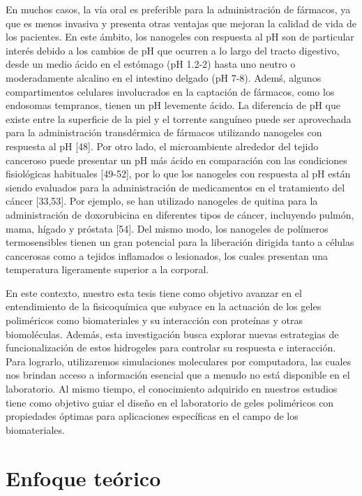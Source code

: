 En muchos casos, la v\'ia oral es preferible para la administraci\'on de f\'armacos, ya que es menos invasiva y presenta otras ventajas que mejoran la calidad de vida de los pacientes. En este \'ambito, los nanogeles con respuesta al pH son de particular inter\'es debido a los cambios de pH que ocurren a lo largo del tracto digestivo, desde un medio \'acido en el est\'omago (pH 1.2-2) hasta uno neutro o moderadamente alcalino en el intestino delgado (pH 7-8). Adem\'s, algunos compartimentos celulares involucrados en la captaci\'on de f\'armacos, como los endosomas tempranos, tienen un pH levemente \'acido. La diferencia de pH que existe entre la superficie de la piel  y el torrente sangu\'ineo puede ser aprovechada para la administraci\'on transd\'ermica de f\'armacos utilizando nanogeles con respuesta al pH [48]. Por otro lado, el microambiente alrededor del tejido canceroso puede presentar un pH m\'as ácido en comparaci\'on con las condiciones fisiol\'ogicas habituales [49-52], por lo que los nanogeles con respuesta al pH est\'an siendo evaluados para la administraci\'on de medicamentos en el tratamiento del c\'ancer [33,53]. Por ejemplo, se han utilizado nanogeles de quitina para la administraci\'on de doxorubicina en diferentes tipos de c\'ancer, incluyendo pulm\'on, mama, h\'igado y pr\'ostata [54]. Del mismo modo, los nanogeles de pol\'imeros termosensibles tienen un gran potencial para la liberaci\'on dirigida tanto a c\'elulas cancerosas como a tejidos inflamados o lesionados, los cuales presentan una temperatura ligeramente superior a la corporal.
	
En este contexto, nuestro esta tesis tiene como objetivo avanzar en el entendimiento de la fisicoqu\'imica que subyace en la actuaci\'on de los geles polim\'ericos como biomateriales y su interacci\'on con prote\'inas y otras biomol\'eculas. Adem\'as, esta investigaci\'on busca explorar nuevas estrategias de funcionalizaci\'on de estos hidrogeles para controlar su respuesta e interacci\'on. Para lograrlo, utilizaremos simulaciones moleculares por computadora, las cuales nos brindan acceso a informaci\'on esencial que a menudo no est\'a disponible en el laboratorio. Al mismo tiempo, el conocimiento adquirido en nuestros estudios tiene como objetivo guiar el dise\~no en el laboratorio de geles polim\'ericos con propiedades \'optimas para aplicaciones espec\'ificas en el campo de los biomateriales.


\section{Enfoque te\'orico}


